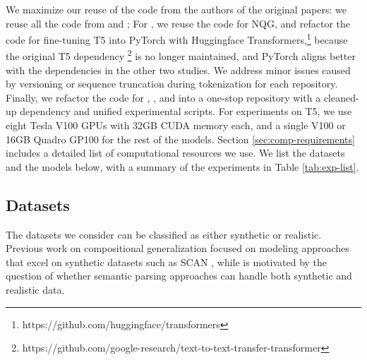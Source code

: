 We maximize our reuse of the code from the authors of the original papers: we reuse all the code from \cite{kim2021sequencetosequence} and \cite{kim-linzen-2020-cogs}; For \cite{shaw-etal-2021-compositional}, we reuse the code for NQG, and refactor the code for fine-tuning T5 into PyTorch with Huggingface Transformers,\footnote{https://github.com/huggingface/transformers} because the original T5 dependency \footnote{https://github.com/google-research/text-to-text-transfer-transformer} is no longer maintained, and PyTorch aligns better with the dependencies in the other two studies.
We address minor issues caused by versioning or sequence truncation during tokenization for each repository.
Finally, we refactor the code for \cite{shaw-etal-2021-compositional}, \cite{kim2021sequencetosequence}, and \cite{kim-linzen-2020-cogs} into a one-stop repository with a cleaned-up dependency and unified experimental scripts. 
For experiments on T5, we use eight Tesla V100 GPUs with 32GB CUDA memory each, and a single V100 or 16GB Quadro GP100 for the rest of the models. Section \ref{sec:comp-requirements} includes a detailed list of computational resources we use.
We list the datasets and the models below, with a summary of the experiments in Table \ref{tab:exp-list}.


\subsection{Datasets}



The datasets we consider can be classified as either synthetic or realistic. 
Previous work on compositional generalization \citep{li-etal-2019-compositional, lake2019compositional, russin1904compositional, gordon2020permutation, liu2020compositional, chen2020compositional, nye2020learning} focused on modeling approaches that excel on synthetic datasets such as SCAN \cite{lake2018generalization}, while \cite{shaw-etal-2021-compositional} is motivated by the question of whether semantic parsing approaches can handle both synthetic and realistic data.

